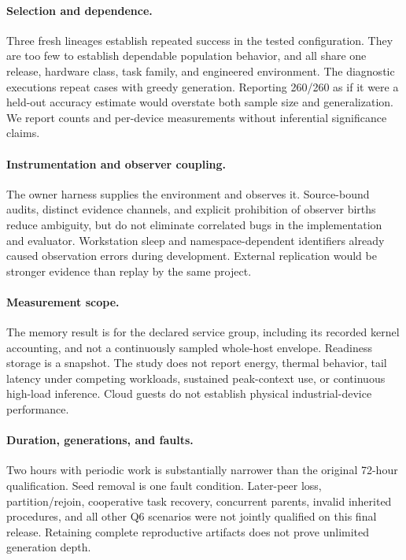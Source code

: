 \documentclass[11pt,letterpaper]{article}
\begin{document}
\paragraph{Selection and dependence.}
Three fresh lineages establish repeated success in the tested configuration.
They are too few to establish dependable population behavior, and all share
one release, hardware class, task family, and engineered environment.
The diagnostic executions repeat cases with greedy generation. Reporting
260/260 as if it were a held-out accuracy estimate would overstate both sample
size and generalization. We report counts and per-device measurements without
inferential significance claims.

\paragraph{Instrumentation and observer coupling.}
The owner harness supplies the environment and observes it. Source-bound
audits, distinct evidence channels, and explicit prohibition of observer births
reduce ambiguity, but do not eliminate correlated bugs in the implementation
and evaluator. Workstation sleep and namespace-dependent identifiers already
caused observation errors during development. External replication would be
stronger evidence than replay by the same project.

\paragraph{Measurement scope.}
The memory result is for the declared service group, including its recorded
kernel accounting, and not a continuously sampled whole-host envelope.
Readiness storage is a snapshot. The study does not report energy, thermal
behavior, tail latency under competing workloads, sustained peak-context use,
or continuous high-load inference. Cloud guests do not establish physical
industrial-device performance.

\paragraph{Duration, generations, and faults.}
Two hours with periodic work is substantially narrower than the original
72-hour qualification. Seed removal is one fault condition. Later-peer loss,
partition/rejoin, cooperative task recovery, concurrent parents, invalid
inherited procedures, and all other Q6 scenarios were not jointly qualified
on this final release. Retaining complete reproductive artifacts does not
prove unlimited generation depth.
\end{document}

